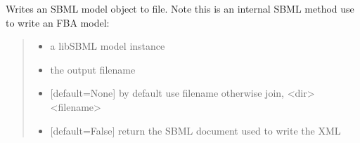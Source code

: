 \documentclass[letterpaper,12pt,english]{sphinxmanual}
\begin{document}
\begin{fulllineitems}
\label{\detokenize{api/io:cbmpy.CBXML.sbml_exportSBML2FBAModel}}
\pysigstartsignatures
\pysiglinewithargsret
{}
{\sphinxparamcomma {}\sphinxparamcomma {}\sphinxparamcomma {}\sphinxparamcomma {}}
{}
\pysigstopsignatures
\sphinxAtStartPar
Writes an SBML model object to file. Note this is an internal SBML method use  to write an FBA model:
\begin{quote}\begin{description}
\begin{itemize}
\item {} 
\sphinxAtStartPar
{} \textendash{} a libSBML model instance

\item {} 
\sphinxAtStartPar
{} \textendash{} the output filename

\item {} 
\sphinxAtStartPar
{} \textendash{} {[}default=None{]} by default use filename otherwise join, \textless{}dir\textgreater{}\textless{}filename\textgreater{}

\item {} 
\sphinxAtStartPar
{} \textendash{} {[}default=False{]} return the SBML document used to write the XML

\end{itemize}

\end{description}\end{quote}

\end{fulllineitems}

\end{document}
